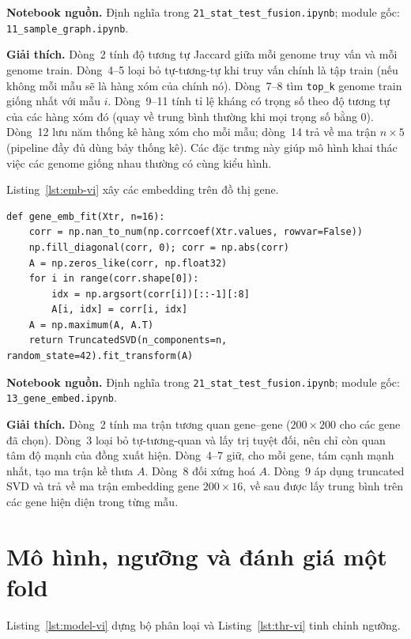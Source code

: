 \documentclass[../main.tex]{subfiles}
\begin{document}
\noindent\textbf{Notebook nguồn.} Định nghĩa trong \texttt{21\_stat\_test\_fusion.ipynb}; module gốc: \texttt{11\_sample\_graph.ipynb}.

\noindent\textbf{Giải thích.} Dòng~2 tính độ tương tự Jaccard giữa mỗi genome truy vấn và mỗi genome train. Dòng~4--5 loại bỏ tự-tương-tự khi truy vấn chính là tập train (nếu không mỗi mẫu sẽ là hàng xóm của chính nó). Dòng~7--8 tìm \texttt{top\_k} genome train giống nhất với mẫu $i$. Dòng~9--11 tính tỉ lệ kháng có trọng số theo độ tương tự của các hàng xóm đó (quay về trung bình thường khi mọi trọng số bằng $0$). Dòng~12 lưu năm thống kê hàng xóm cho mỗi mẫu; dòng~14 trả về ma trận $n\times 5$ (pipeline đầy đủ dùng bảy thống kê). Các đặc trưng này giúp mô hình khai thác việc các genome giống nhau thường có cùng kiểu hình.

Listing~\ref{lst:emb-vi} xây các embedding trên đồ thị gene.

\begin{lstlisting}[caption={Embedding đồ thị gene bằng truncated SVD.},label=lst:emb-vi]
def gene_emb_fit(Xtr, n=16):
    corr = np.nan_to_num(np.corrcoef(Xtr.values, rowvar=False))
    np.fill_diagonal(corr, 0); corr = np.abs(corr)
    A = np.zeros_like(corr, np.float32)
    for i in range(corr.shape[0]):
        idx = np.argsort(corr[i])[::-1][:8]
        A[i, idx] = corr[i, idx]
    A = np.maximum(A, A.T)
    return TruncatedSVD(n_components=n, random_state=42).fit_transform(A)
\end{lstlisting}

\noindent\textbf{Notebook nguồn.} Định nghĩa trong \texttt{21\_stat\_test\_fusion.ipynb}; module gốc: \texttt{13\_gene\_embed.ipynb}.

\noindent\textbf{Giải thích.} Dòng~2 tính ma trận tương quan gene--gene ($200\times 200$ cho các gene đã chọn). Dòng~3 loại bỏ tự-tương-quan và lấy trị tuyệt đối, nên chỉ còn quan tâm độ mạnh của đồng xuất hiện. Dòng~4--7 giữ, cho mỗi gene, tám cạnh mạnh nhất, tạo ma trận kề thưa $A$. Dòng~8 đối xứng hoá $A$. Dòng~9 áp dụng truncated SVD và trả về ma trận embedding gene $200\times 16$, về sau được lấy trung bình trên các gene hiện diện trong từng mẫu.

\section{Mô hình, ngưỡng và đánh giá một fold}

Listing~\ref{lst:model-vi} dựng bộ phân loại và Listing~\ref{lst:thr-vi} tinh chỉnh ngưỡng.
\end{document}
